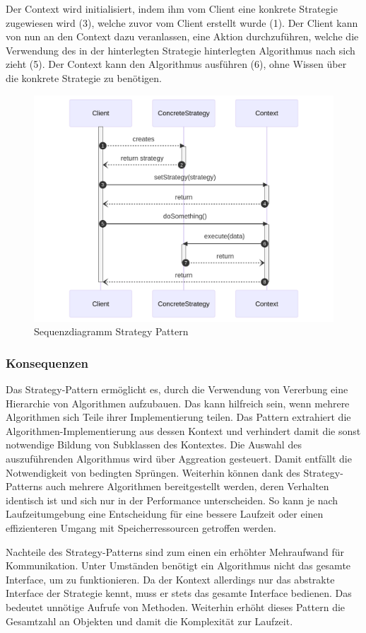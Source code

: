 Der Context wird initialisiert, indem ihm vom Client eine konkrete Strategie zugewiesen wird (3), welche zuvor vom Client erstellt wurde (1). Der Client kann von nun an den Context dazu veranlassen, eine Aktion durchzuführen, welche die Verwendung des in der hinterlegten Strategie hinterlegten Algorithmus nach sich zieht (5). Der Context kann den Algorithmus ausführen (6), ohne Wissen über die konkrete Strategie zu benötigen. 

\begin{figure}[!hb]
	\centering
	\includegraphics[width=0.75\linewidth]{images/patterns/strategy-seq.png}
	\caption{Sequenzdiagramm Strategy Pattern}
	\label{fig:strategy-seq}
\end{figure}

\subsubsection*{Konsequenzen}
Das Strategy-Pattern ermöglicht es, durch die Verwendung von Vererbung eine Hierarchie von Algorithmen aufzubauen. Das kann hilfreich sein, wenn mehrere Algorithmen sich Teile ihrer Implementierung teilen. Das Pattern extrahiert die Algorithmen-Implementierung aus dessen Kontext und verhindert damit die sonst notwendige Bildung von Subklassen des Kontextes. Die Auswahl des auszuführenden Algorithmus wird über Aggreation gesteuert. Damit entfällt die Notwendigkeit von bedingten Sprüngen. Weiterhin können dank des Strategy-Patterns auch mehrere Algorithmen bereitgestellt werden, deren Verhalten identisch ist und sich nur in der Performance unterscheiden. So kann je nach Laufzeitumgebung eine Entscheidung für eine bessere Laufzeit oder einen effizienteren Umgang mit Speicherressourcen getroffen werden.

Nachteile des Strategy-Patterns sind zum einen ein erhöhter Mehraufwand für Kommunikation. Unter Umständen benötigt ein Algorithmus nicht das gesamte Interface, um zu funktionieren. Da der Kontext allerdings nur das abstrakte Interface der Strategie kennt, muss er stets das gesamte Interface bedienen. Das bedeutet unnötige Aufrufe von Methoden. Weiterhin erhöht dieses Pattern die Gesamtzahl an Objekten und damit die Komplexität zur Laufzeit.